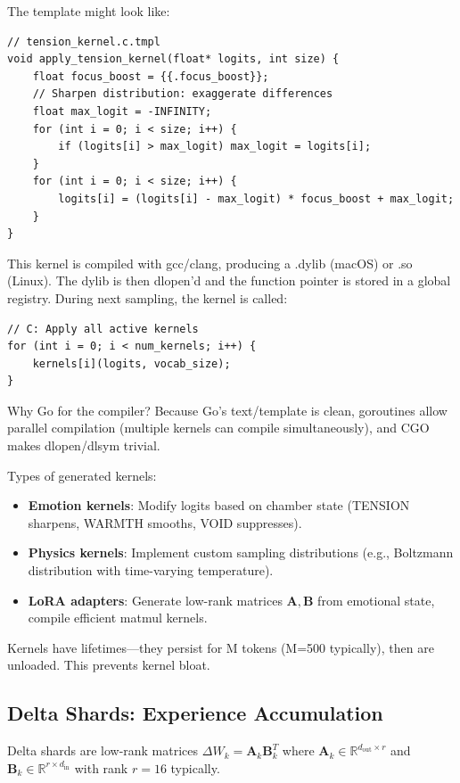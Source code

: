 \documentclass[11pt,a4paper]{article}
\begin{document}
The template might look like:

\begin{verbatim}
// tension_kernel.c.tmpl
void apply_tension_kernel(float* logits, int size) {
    float focus_boost = {{.focus_boost}};
    // Sharpen distribution: exaggerate differences
    float max_logit = -INFINITY;
    for (int i = 0; i < size; i++) {
        if (logits[i] > max_logit) max_logit = logits[i];
    }
    for (int i = 0; i < size; i++) {
        logits[i] = (logits[i] - max_logit) * focus_boost + max_logit;
    }
}
\end{verbatim}

This kernel is compiled with gcc/clang, producing a .dylib (macOS) or .so (Linux). The dylib is then dlopen'd and the function pointer is stored in a global registry. During next sampling, the kernel is called:

\begin{verbatim}
// C: Apply all active kernels
for (int i = 0; i < num_kernels; i++) {
    kernels[i](logits, vocab_size);
}
\end{verbatim}

Why Go for the compiler? Because Go's text/template is clean, goroutines allow parallel compilation (multiple kernels can compile simultaneously), and CGO makes dlopen/dlsym trivial.

Types of generated kernels:

\begin{itemize}
\item \textbf{Emotion kernels}: Modify logits based on chamber state (TENSION sharpens, WARMTH smooths, VOID suppresses).
\item \textbf{Physics kernels}: Implement custom sampling distributions (e.g., Boltzmann distribution with time-varying temperature).
\item \textbf{LoRA adapters}: Generate low-rank matrices $\mathbf{A}, \mathbf{B}$ from emotional state, compile efficient matmul kernels.
\end{itemize}

Kernels have lifetimes—they persist for M tokens (M=500 typically), then are unloaded. This prevents kernel bloat.

\subsection{Delta Shards: Experience Accumulation}

Delta shards are low-rank matrices $\Delta W_k = \mathbf{A}_k \mathbf{B}_k^T$ where $\mathbf{A}_k \in \mathbb{R}^{d_{\text{out}} \times r}$ and $\mathbf{B}_k \in \mathbb{R}^{r \times d_{\text{in}}}$ with rank $r = 16$ typically.
\end{document}

